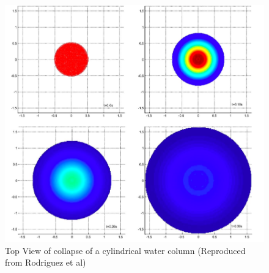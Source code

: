 \documentclass{article}
\begin{document}
\begin{figure}[!htbp]
  \centering
  \includegraphics[width=1.1\linewidth]{rodri2.png}
  \caption{Top View of collapse of a cylindrical water column (Reproduced from Rodriguez et al)}
  \label{fig:sub14}
\end{figure}
\end{document}
